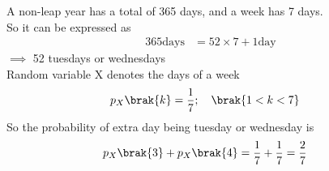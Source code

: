 A non-leap year has a total of 365 days, and a week has 7 days.\\
So it can be expressed as 
\begin{align}
365\text{days} &=52\times 7+1 \text{day}
\end{align}
$\implies$ 52 tuesdays or wednesdays\\
Random variable X denotes the days of a week
\begin{align}
p_X\brak{k}&=\frac{1}{7}; \quad \brak{1<k<7}
\end{align}
So the probability of extra day being tuesday or wednesday is
\begin{align}
p_X\brak{3}+p_X\brak{4}&=\frac{1}{7}+\frac{1}{7}=\frac{2}{7}
\end{align}


